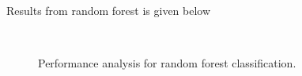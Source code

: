 Results from random forest is given below
\begin{figure}[H]
\begin{center}
     \\
\end{center}
\caption[caption]{Performance analysis for random forest classification.}
\label{fig:forest-performance}
\end{figure}


